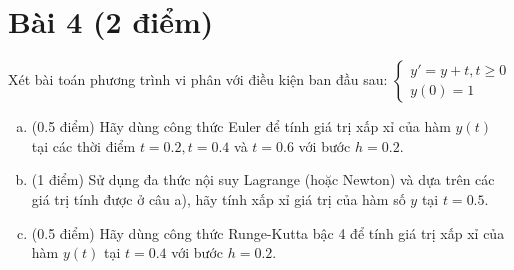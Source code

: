 \documentclass[12pt]{article}
\begin{document}
\section{Bài 4 (2 điểm)}

Xét bài toán phương trình vi phân với điều kiện ban đầu sau:
$
 \left\lbrace \begin{array}{l}
               y' = y+t, t \geq 0 \\
               y(0)=1
              \end{array}
\right.
$

\begin{enumerate}[a).]
\item (0.5 điểm) Hãy dùng công thức Euler để tính giá trị xấp xỉ của hàm $y(t)$ tại các thời điểm $t=0.2, t=0.4$ và $t=0.6$ với bước $h=0.2$.
\item (1 điểm) Sử dụng đa thức nội suy Lagrange (hoặc Newton) và dựa trên các giá trị tính được ở câu a), hãy tính xấp xỉ giá trị của hàm số $y$ tại $t=0.5$.
\item (0.5 điểm) Hãy dùng công thức Runge-Kutta bậc 4 để tính giá trị xấp xỉ của hàm $y(t)$ tại $t=0.4$ với bước $h=0.2$.
\end{enumerate}
\end{document}
